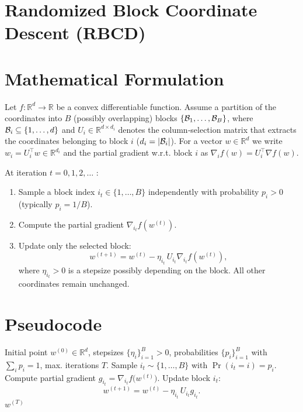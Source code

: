 \documentclass{article}
\newcommand{\R}{\mathbb{R}}
\begin{document}
\section*{Randomized Block Coordinate Descent (RBCD)}

\section*{Mathematical Formulation}
Let $f:\R^{d}\rightarrow\R$ be a convex differentiable function.  
Assume a partition of the coordinates into $B$ (possibly overlapping) blocks  
$\{ {\cal B}_{1},\dots,{\cal B}_{B}\}$, where ${\cal B}_{i}\subseteq\{1,\dots,d\}$ and
$U_{i}\in\R^{d\times d_{i}}$ denotes the column‑selection matrix that extracts the
coordinates belonging to block $i$ ($d_{i}=|{\cal B}_{i}|$).  
For a vector $w\in\R^{d}$ we write $w_{i}=U_i^{\top}w\in\R^{d_i}$ and the partial
gradient w.r.t. block $i$ as $\nabla_i f(w)=U_i^{\top}\nabla f(w)$.

At iteration $t=0,1,2,\dots$ :

\begin{enumerate}[label=\arabic*)]
\item Sample a block index $i_t\in\{1,\dots,B\}$ independently with probability
$p_i>0$ (typically $p_i=1/B$).
\item Compute the partial gradient $\nabla_{i_t} f(w^{(t)})$.
\item Update only the selected block:
\[
w^{(t+1)} = w^{(t)} - \eta_{i_t}\,U_{i_t}\nabla_{i_t} f(w^{(t)}),
\]
where $\eta_{i_t}>0$ is a stepsize possibly depending on the block.
All other coordinates remain unchanged.
\end{enumerate}

\section*{Pseudocode}
\begin{algorithm}[H]
\caption{Randomized Block Coordinate Descent}
\begin{algorithmic}[1]
\REQUIRE Initial point $w^{(0)}\in\R^{d}$, stepsizes $\{\eta_i\}_{i=1}^{B}>0$, 
probabilities $\{p_i\}_{i=1}^{B}$ with $\sum_{i}p_i=1$, 
max. iterations $T$.
    \STATE Sample $i_t\sim\{1,\dots,B\}$ with $\Pr(i_t=i)=p_i$.
    \STATE Compute partial gradient $g_{i_t}= \nabla_{i_t}f\!\big(w^{(t)}\big)$.
    \STATE Update block $i_t$:
    \[
    w^{(t+1)} = w^{(t)} - \eta_{i_t}\,U_{i_t} g_{i_t}.
    \]
\ENDFOR
\RETURN $w^{(T)}$
\end{algorithmic}
\end{algorithm}
\end{document}
